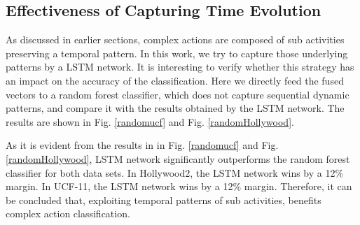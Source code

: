 \subsection{Effectiveness of Capturing Time Evolution}
As discussed in earlier sections, complex actions are composed of sub activities preserving
a temporal pattern. In this work, we try to capture those underlying patterns by a LSTM network.
It is interesting to verify whether this strategy has an impact on the accuracy of the
classification. Here we directly feed the fused vectors to a random forest classifier, which
does not capture sequential dynamic patterns, and compare it with the results obtained by
the LSTM network. The results are shown in Fig. \ref{randomucf} and Fig. \ref{randomHollywood}.


As it is evident from the results in in Fig. \ref{randomucf} and Fig. \ref{randomHollywood}, LSTM network significantly outperforms the
random forest classifier for both data sets. In Hollywood2, the LSTM network wins by a 12\% margin. In UCF-11, the LSTM network wins by a 12\% margin.
Therefore, it can be concluded that, exploiting
temporal patterns of sub activities, benefits complex action classification.



\mydata


